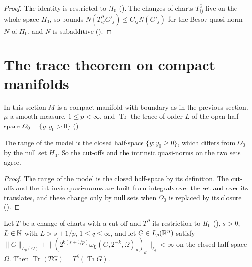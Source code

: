 \begin{proof}
\leanok
The identity is  restricted to $H_0$
(). The changes of charts $T^\partial_{ij}$ live on the whole
space $H_0$, so  bounds
$N(T^\partial_{ij} G'_j) \leq C_{ij} N(G'_j)$ for the Besov quasi-norm $N$ of $H_0$, and $N$ is
subadditive ().
\end{proof}

\section{The trace theorem on compact manifolds}
\label{sec:manifold-trace}

In this section $M$ is a compact manifold with boundary as in the previous section, $\mu$ a smooth
measure, $1 \leq p < \infty$, and $\operatorname{Tr}$ the trace of order $L$ of the open
half-space $\Omega_0 = \{y : y_0 > 0\}$ ().

\begin{lemma}
\label{lem:closed-open-half-space}
\leanok
{}
The range of the model is the closed half-space $\{y : y_0 \geq 0\}$, which differs from
$\Omega_0$ by the null set $H_0$. So the cut-offs and the intrinsic quasi-norms on the two sets
agree.
\end{lemma}

\begin{proof}
\leanok
The range of the model is the closed half-space by its definition. The cut-offs and the
intrinsic quasi-norms are built from integrals over the set and over its translates, and these
change only by null sets when $\Omega_0$ is replaced by its closure
().
\end{proof}

\begin{theorem}
\label{thm:trace-chart-change}
\leanok
{}
Let $T$ be a change of charts with a cut-off and $T^\partial$ its restriction to $H_0$
(), $s > 0$, $L \in \mathbb{N}$ with $L > s + 1/p$,
$1 \leq q \leq \infty$, and let $G \in L_p(\mathbb{R}^n)$ satisfy
$\|G\|_{L_p(\Omega)} + \|(2^{k(s+1/p)} \omega_L(G, 2^{-k}, \Omega)_p)_k\|_{\ell_q} < \infty$ on the
closed half-space $\Omega$. Then $\operatorname{Tr}(T G) = T^\partial(\operatorname{Tr} G)$.
\end{theorem}

